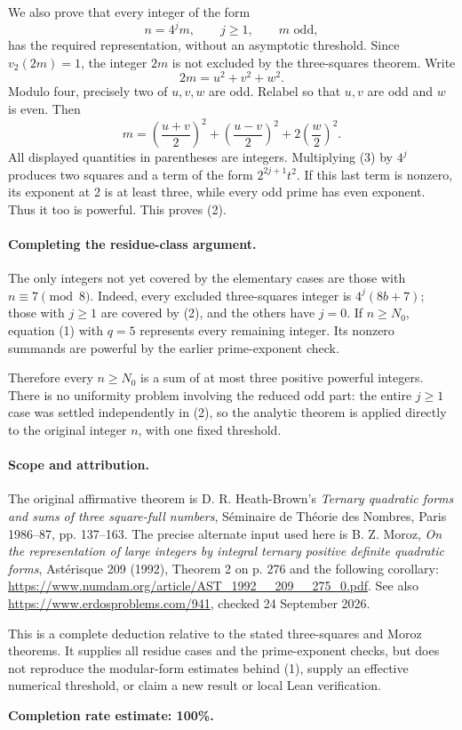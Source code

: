 We also prove that every integer of the form
\[
 n=4^j m,\qquad j\geq1,\qquad m\text{ odd}, \tag{2}
\]
has the required representation, without an asymptotic threshold. Since \(v_2(2m)=1\), the integer \(2m\) is not excluded by the three-squares theorem. Write
\[
 2m=u^2+v^2+w^2.
\]
Modulo four, precisely two of \(u,v,w\) are odd. Relabel so that \(u,v\) are odd and \(w\) is even. Then
\[
 m=\left(\frac{u+v}{2}\right)^2+
   \left(\frac{u-v}{2}\right)^2+
   2\left(\frac w2\right)^2. \tag{3}
\]
All displayed quantities in parentheses are integers. Multiplying (3) by \(4^j\) produces two squares and a term of the form
\(2^{2j+1}t^2\). If this last term is nonzero, its exponent at 2 is at least three, while every odd prime has even exponent. Thus it too is powerful. This proves (2).

\paragraph{Completing the residue-class argument.}
The only integers not yet covered by the elementary cases are those with \(n\equiv7\pmod8\). Indeed, every excluded three-squares integer is \(4^j(8b+7)\); those with \(j\geq1\) are covered by (2), and the others have \(j=0\). If \(n\geq N_0\), equation (1) with \(q=5\) represents every remaining integer. Its nonzero summands are powerful by the earlier prime-exponent check.

Therefore every \(n\geq N_0\) is a sum of at most three positive powerful integers. There is no uniformity problem involving the reduced odd part: the entire \(j\geq1\) case was settled independently in (2), so the analytic theorem is applied directly to the original integer \(n\), with one fixed threshold.

\paragraph{Scope and attribution.}
The original affirmative theorem is D. R. Heath-Brown's \emph{Ternary quadratic forms and sums of three square-full numbers}, S\'eminaire de Th\'eorie des Nombres, Paris 1986--87, pp. 137--163. The precise alternate input used here is B. Z. Moroz, \emph{On the representation of large integers by integral ternary positive definite quadratic forms}, Ast\'erisque 209 (1992), Theorem 2 on p. 276 and the following corollary: \url{https://www.numdam.org/article/AST_1992__209__275_0.pdf}. See also \url{https://www.erdosproblems.com/941}, checked 24 September 2026.

This is a complete deduction relative to the stated three-squares and Moroz theorems. It supplies all residue cases and the prime-exponent checks, but does not reproduce the modular-form estimates behind (1), supply an effective numerical threshold, or claim a new result or local Lean verification.

\textbf{Completion rate estimate: 100\%.}
